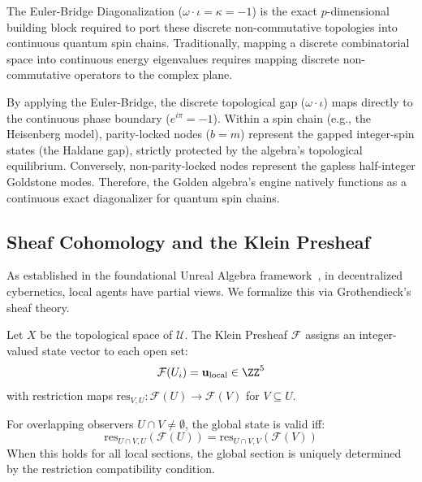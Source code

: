 The Euler-Bridge Diagonalization ($\omega \cdot \iota = \kappa = -1$) is the exact $p$-dimensional building block required to port these discrete non-commutative topologies into continuous quantum spin chains. Traditionally, mapping a discrete combinatorial space into continuous energy eigenvalues requires mapping discrete non-commutative operators to the complex plane. 

By applying the Euler-Bridge, the discrete topological gap ($\omega \cdot \iota$) maps directly to the continuous phase boundary ($e^{i\pi} = -1$). Within a spin chain (e.g., the Heisenberg model), parity-locked nodes ($b=m$) represent the gapped integer-spin states (the Haldane gap), strictly protected by the algebra's topological equilibrium. Conversely, non-parity-locked nodes represent the gapless half-integer Goldstone modes. Therefore, the Golden algebra's engine natively functions as a continuous exact diagonalizer for quantum spin chains.

\subsection{Sheaf Cohomology and the Klein Presheaf}

As established in the foundational Unreal Algebra framework~\cite{larue_lc}, in decentralized cybernetics, local agents have partial views. We formalize this via Grothendieck's sheaf theory.

\begin{definition}\label{def:presheaf}
Let $X$ be the topological space of $\mathcal{U}$. The Klein Presheaf $\mathcal{F}$ assigns an integer-valued state vector to each open set:
$$\mathcal{F}(U_i) = \mathbf{u}_{\text{local}} \in \ZZ^5$$
with restriction maps $\mathrm{res}_{V,U}: \mathcal{F}(U) \to \mathcal{F}(V)$ for $V \subseteq U$.
\end{definition}

\begin{theorem}\label{thm:gluing}
For overlapping observers $U \cap V \neq \emptyset$, the global state is valid iff:
$$\mathrm{res}_{U \cap V, U}(\mathcal{F}(U)) = \mathrm{res}_{U \cap V, V}(\mathcal{F}(V))$$
When this holds for all local sections, the global section is uniquely determined by the restriction compatibility condition.
\end{theorem}

